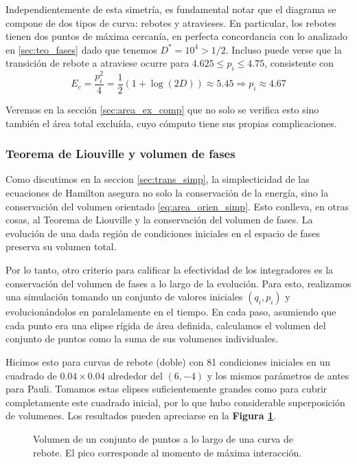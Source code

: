 Independientemente de esta simetría, es fundamental notar que el diagrama se compone de dos tipos de curva: rebotes y atravieses.
En particular, los rebotes tienen dos puntos de máxima cercanía, en perfecta concordancia con lo analizado en \ref{sec:teo_fases} dado que tenemos $D^*=10^4>1/2$.
Incluso puede verse que la transición de rebote a atraviese ocurre para $4.625\leq p_i\leq4.75$, consistente con
\[ E_c = \frac{p_i^2}{4} = \frac{1}{2}\left( 1 + \log(2D) \right) \approx 5.45 \Longrightarrow p_i \approx 4.67 \]

Veremos en la sección \ref{sec:area_ex_comp} que no solo se verifica esto sino también el área total excluída, cuyo cómputo tiene sus propias complicaciones.


\subsubsection{Teorema de Liouville y volumen de fases}

Como discutimos en la seccion \ref{sec:trans_simp}, la simplecticidad de las ecuaciones de Hamilton asegura no solo la conservación de la energía, sino la conservación del volumen orientado \eqref{eq:area_orien_simp}.
Esto conlleva, en otras cosas, al Teorema de Liouville y la conservación del volumen de fases.
La evolución de una dada región de condiciones iniciales en el espacio de fases preserva su volumen total.

Por lo tanto, otro criterio para calificar la efectividad de los integradores es la conservación del volumen de fases a lo largo de la evolución.
Para esto, realizamos una simulación tomando un conjunto de valores iniciales $(q_i, p_i)$ y evolucionándolos en paralelamente en el tiempo.
En cada paso, asumiendo que cada punto era una elipse rígida de área definida, calculamos el volumen del conjunto de puntos como la suma de sus volumenes individuales.

Hicimos esto para curvas de rebote (doble) con 81 condiciones iniciales en un cuadrado de $0.04\times0.04$ alrededor del $(6, -4)$ y los mismos parámetros de antes para Pauli.
Tomamos estas elipses suficientemente grandes como para cubrir completamente este cuadrado inicial, por lo que hubo considerable superposición de volumenes.
Los resultados pueden apreciarse en la \textbf{Figura \ref{fig:vol_fas}}.

\begin{figure}[h]
	\centering
	\caption{Volumen de un conjunto de puntos a lo largo de una curva de rebote. El pico corresponde al momento de máxima interacción.}
	\label{fig:vol_fas}
\end{figure}

